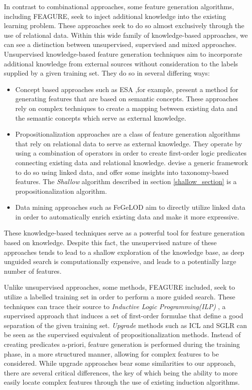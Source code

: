 \documentclass[twoside,11pt]{article}
\theoremstyle{definition}
\begin{document}
In contrast to combinational approaches, some feature generation algorithms, including FEAGURE, seek to inject additional knowledge into the existing learning problem. These approaches seek to do so almost exclusively through the use of relational data. 
Within this wide family of knowledge-based approaches, we can see a distinction between unsupervised, supervised and mixed approaches.
Unsupervised knowledge-based feature generation techniques aim to incorporate additional knowledge from external sources without consideration to the labels supplied by a given training set. They do so in several differing ways:
\begin{itemize}
	\item Concept based approaches such as ESA \cite{gabrilovich2009wikipediafull} ,for example, present a method for generating features that are based on semantic concepts. These approaches rely on complex techniques to create a mapping between existing data and the semantic concepts which serve as external knowledge.
	\item Propositionalization \cite{kramer2000bottom} approaches are a class of feature generation algorithms that rely on relational data to serve as external knowledge. They operate by using a combination of operators in order to create first-order logic predicates connecting existing data and relational knowledge.
	 devise a generic framework to do so using linked data, and offer some insights into taxonomy-based features.
	The \emph{Shallow} algorithm described in section \ref{shallow_section} is a propositionalization algorithm.
	\item Data mining approaches such as FeGeLOD \cite{paulheim2012unsupervisedfull} aim to directly utilize linked data in order to automatically enrich existing data and make it more expressive.
\end{itemize}
These knowledge-based techniques serve as a powerful tool for feature generation based on knowledge. Despite this fact, the unsupervised nature of these approaches tends to lead to a shallow exploration of the knowledge base, as deep unguided search is computationally expensive, and leads to a potentially large number of features.

Unlike unsupervised approaches, some methods, FEAGURE included, seek to utilize a labelled training set in order to perform a more guided search. 
These techniques can trace their source to \emph{Inductive Logic Programming(ILP)} \cite{quinlan1990learning,muggleton1991inductive}, a supervised approach that induces a set of first-order formulae that define a good separation of the given training set.
 \emph{Upgrade} methods such as ICL \cite{van2001upgrade} and SGLR \cite{popescul200716} can be seen as the supervised equivalent of propositionalization methods. Instead of creating predicates a-priori, feature generation is performed during the training phase, in a more structured manner, allowing for complex features to be considered.
 While upgrade approaches bear some similarities to our approach, there are several critical differences, the key of which being the ability to more easily locate complex features through the use of existing induction algorithms. 
\end{document}

